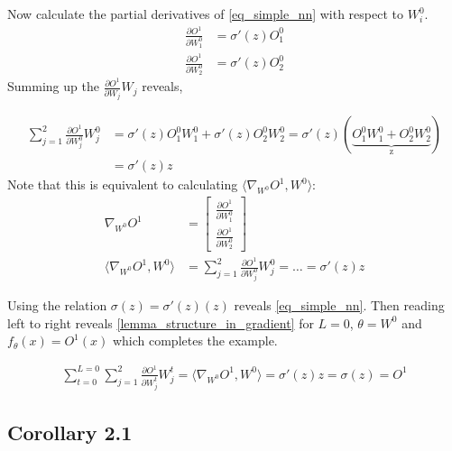 \documentclass[a4paper]{article}
\begin{document}
Now calculate the partial derivatives of \eqref{eq_simple_nn} with respect to $W^0_i$.
\begin{align*}
	\frac{\partial O^1}{\partial W^0_1} &= \sigma'(z) O^0_1 \\
	\frac{\partial O^1}{\partial W^0_2} &= \sigma'(z) O^0_2
\end{align*}
Summing up the $\frac{\partial O^1}{\partial W_j} W_j$ reveals,

\begin{align*}
	\sum_{j=1}^{2} \frac{\partial O^1}{\partial W^0_j} W^0_j &= \sigma'(z) O^0_1  W^0_1 + \sigma'(z) O^0_2  W^0_2 = \sigma'(z)(\underbrace{O^0_1 W^0_1 + O^0_2 W^0_2}_\text{z}) \\
														&= \sigma'(z) z
\end{align*}
Note that this is equivalent to calculating $\langle \nabla_{W^0} O^1, W^0 \rangle$:
\begin{align*}
	\nabla_{W^0} O^1 &= 
		\begin{bmatrix}
			\frac{\partial O^1}{\partial W^0_1} \\ 
			\frac{\partial O^1}{\partial W^0_2}
		\end{bmatrix} \\
	\langle \nabla_{W^0} O^1, W^0 \rangle &= \sum_{j=1}^{2} \frac{\partial O^1}{\partial W^0_j} W^0_j = \dots = \sigma'(z) z
\end{align*}

Using the relation $\sigma(z) = \sigma'(z)(z)$ reveals \eqref{eq_simple_nn}. Then reading left to right reveals \eqref{lemma_structure_in_gradient} for $L=0$, $\theta= W^0$ and $f_\theta(x) = O^1(x)$ which completes the example.

\begin{align*}
		\sum_{t=0}^{L=0} \sum_{j=1}^{2} \frac{\partial O^1}{\partial W^t_j} W^t_j
		=  \langle \nabla_{W^0} O^1, W^0 \rangle
		= \sigma'(z) z 
		= \sigma(z) = O^1
\end{align*}



\subsection{Corollary 2.1}
\end{document}

